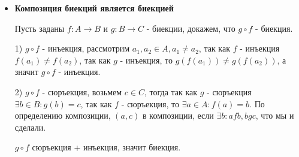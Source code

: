 \begin{itemize}
	\item \textbf{Композиция биекций является биекцией}
	
	Пусть заданы $f : A \to B$ и $g : B \to C$ - биекции, докажем, что $g \circ f$ - биекция.
	
	1) $g \circ f$ - инъекция, рассмотрим $a_1, a_2 \in A, a_1 \neq a_2$, так как $f$ - инъекция $f(a_1) \neq f(a_2)$, так как $g$ - инъекция, то $g(f(a_1)) \neq g(f(a_2))$, а значит $g \circ f$ - инъекция.
	
	2) $g \circ f$ - сюръекция, возьмем $c \in C$, тогда так как $g$ - сюръекция $\exists b \in B : g(b) = c$, так как $f$ - сюръекция, то $\exists a \in A : f(a) = b$. По определению композиции, $(a, c)$ в композиции, если $\exists b : afb, bgc$, что мы и сделали.
	
	$g \circ f$ сюръекция + инъекция, значит биекция. 
\end{itemize}